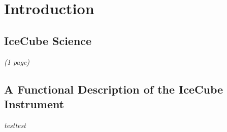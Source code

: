 
\section{Introduction}
\label{sec:intro}

\subsection{IceCube Science}
\textsl{(1 page)}

\subsection{A Functional Description of the IceCube Instrument}

\textit{testtest}

